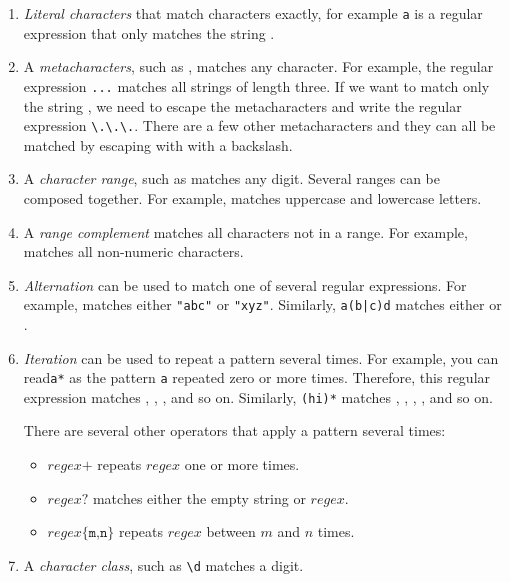 \begin{enumerate}

 \item  \emph{Literal characters} that match characters exactly, for example \texttt{a} is a regular expression that only matches the string .

  \item A \emph{metacharacters}, such as , matches any character. For example, the regular expression \texttt{...} matches all strings of length three. If we want to match only the string , we need to escape the metacharacters and write the regular expression \verb|\.\.\.|. There are a few other metacharacters and they can all be matched by escaping with with a backslash.

  \item A \emph{character range}, such as \scalainline{[0-9]} matches any digit. Several ranges can be composed together. For example, \scalainline{[A-Za-z]} matches uppercase and lowercase letters.

  \item A \emph{range complement} matches all characters not in a range. For example, \scalainline{[^ 0-9]} matches all non-numeric characters.

  \item \emph{Alternation} can be used to match one of several regular expressions. For example,  matches either \texttt{"abc"} or \texttt{"xyz"}. Similarly, \texttt{a(b|c)d} matches either  or .

  \item \emph{Iteration} can be used to repeat a pattern several times. For example, you can read\texttt{a*} as the pattern \texttt{a} repeated zero or more times. Therefore, this regular expression matches , , , and so on. Similarly, \texttt{(hi)*} matches , , , , and so on.

  There are several other operators that apply a pattern several times:

  \begin{itemize}
    \item $\mathit{regex}\texttt{+}$ repeats $\mathit{regex}$ one or more times.
    \item $\mathit{regex}\texttt{?}$ matches either the empty string or $\mathit{regex}$.
        \item $\mathit{regex}\texttt{\{m,n\}}$ repeats $\mathit{regex}$ between $m$ and $n$ times.
  \end{itemize}

  \item A \emph{character class}, such as \verb|\d| matches a digit.

\end{enumerate}

